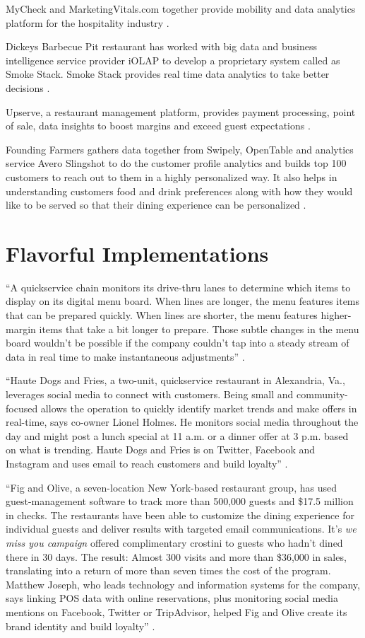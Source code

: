 \documentclass[sigconf]{acmart}
\begin{document}
MyCheck and MarketingVitals.com together provide mobility and data analytics platform for the hospitality industry \cite{www-buss}. 

Dickeys Barbecue Pit restaurant has worked with big data and business intelligence service provider iOLAP to develop a proprietary system called as Smoke Stack. Smoke Stack provides real time data analytics to take better decisions \cite{www-forbes}.

Upserve, a restaurant management platform, provides payment processing, point of sale, data insights to boost margins and exceed guest expectations \cite{www-bostonglobe}\cite{www-upserve}.

Founding Farmers gathers data together from Swipely, OpenTable and analytics service Avero Slingshot to do the customer profile analytics and builds top 100 customers to reach out to them in a highly personalized way. 
It also helps in understanding customers food and drink preferences along with how they would like to be served so that their dining experience can be personalized \cite{KooserAmandaC.2013BD}. 

\section{Flavorful Implementations}
``A quickservice chain monitors its drive-thru lanes to determine which items to display on its digital menu board. When lines are longer, the menu features items that can be prepared quickly. When lines are shorter, the menu features higher-margin items that take a bit longer to prepare. Those subtle changes in the menu board wouldn't be possible if the company couldn't tap into a steady stream of data in real time to make instantaneous adjustments'' \cite{www-restaurant}.


``Haute Dogs and Fries, a two-unit, quickservice restaurant in Alexandria, Va., leverages social media to connect with customers. Being small and community-focused allows the operation to quickly identify market trends and make offers in real-time, says co-owner Lionel Holmes. He monitors social media throughout the day and might post a lunch special at 11 a.m. or a dinner offer at 3 p.m. based on what is trending. Haute Dogs and Fries is on Twitter, Facebook and Instagram and uses email to reach customers and build loyalty'' \cite{www-restaurant}.


``Fig and Olive, a seven-location New York-based restaurant group, has used guest-management software to track more than 500,000 guests and \$17.5 million in checks. The restaurants have been able to customize the dining experience for individual guests and deliver results with targeted email communications. It's \emph{we miss you campaign} offered complimentary crostini to guests who hadn't dined there in 30 days. The result: Almost 300 visits and more than \$36,000 in sales, translating into a return of more than seven times the cost of the program. Matthew Joseph, who leads technology and information systems for the company, says linking POS data with online reservations, plus monitoring social media mentions on Facebook, Twitter or TripAdvisor, helped Fig and Olive create its brand identity and build loyalty'' \cite{www-restaurant}.
\end{document}

